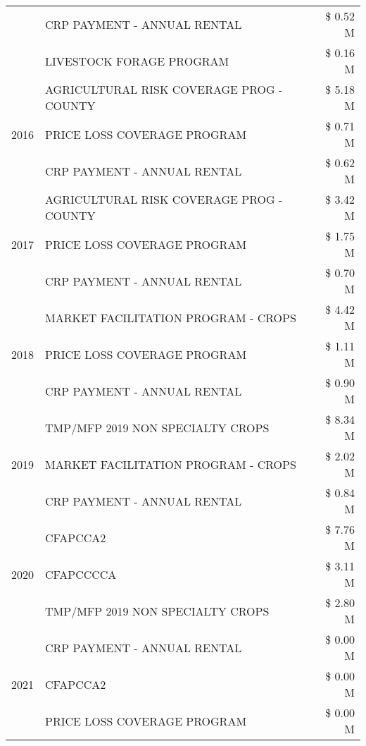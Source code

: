 \begin{tabular}{llr}
 & CRP PAYMENT - ANNUAL RENTAL & \$ 0.52 M \\
 & LIVESTOCK FORAGE PROGRAM & \$ 0.16 M \\
\cline{1-3}
\multirow[t]{3}{*}{2016} & AGRICULTURAL RISK COVERAGE PROG - COUNTY & \$ 5.18 M \\
 & PRICE LOSS COVERAGE PROGRAM & \$ 0.71 M \\
 & CRP PAYMENT - ANNUAL RENTAL & \$ 0.62 M \\
\cline{1-3}
\multirow[t]{3}{*}{2017} & AGRICULTURAL RISK COVERAGE PROG - COUNTY & \$ 3.42 M \\
 & PRICE LOSS COVERAGE PROGRAM & \$ 1.75 M \\
 & CRP PAYMENT - ANNUAL RENTAL & \$ 0.70 M \\
\cline{1-3}
\multirow[t]{3}{*}{2018} & MARKET FACILITATION PROGRAM - CROPS & \$ 4.42 M \\
 & PRICE LOSS COVERAGE PROGRAM & \$ 1.11 M \\
 & CRP PAYMENT - ANNUAL RENTAL & \$ 0.90 M \\
\cline{1-3}
\multirow[t]{3}{*}{2019} & TMP/MFP 2019 NON SPECIALTY CROPS & \$ 8.34 M \\
 & MARKET FACILITATION PROGRAM - CROPS & \$ 2.02 M \\
 & CRP PAYMENT - ANNUAL RENTAL & \$ 0.84 M \\
\cline{1-3}
\multirow[t]{3}{*}{2020} & CFAPCCA2 & \$ 7.76 M \\
 & CFAPCCCCA & \$ 3.11 M \\
 & TMP/MFP 2019 NON SPECIALTY CROPS & \$ 2.80 M \\
\cline{1-3}
\multirow[t]{3}{*}{2021} & CRP PAYMENT - ANNUAL RENTAL & \$ 0.00 M \\
 & CFAPCCA2 & \$ 0.00 M \\
 & PRICE LOSS COVERAGE PROGRAM & \$ 0.00 M \\
\cline{1-3}
\bottomrule
\end{tabular}
